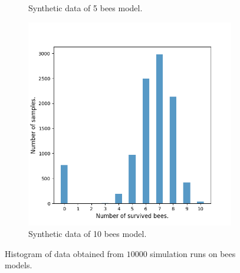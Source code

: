 \begin{figure}[H]
\begin{subfigure}{0.32\textwidth}
        \caption{Synthetic data of 5 bees model.}
    \end{subfigure}
    \hfill
    \begin{subfigure}{0.32\textwidth}
        \centering
        \includegraphics[width=\linewidth]{figures/bee_10_data.png}
        \caption{Synthetic data of 10 bees model.}
    \end{subfigure}
    \caption{Histogram of data obtained from $10000$ simulation runs on bees models.}
\end{figure}

